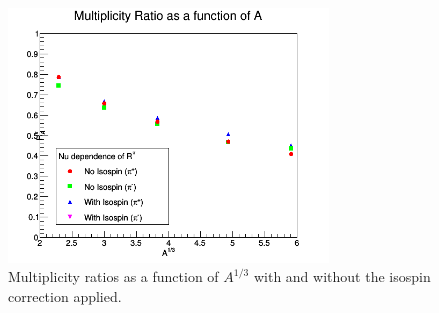\begin{figure}[tbp]
\centering
\includegraphics[width=8.5cm] {new-fig/IsospinCorrection.png}
\caption {Multiplicity ratios as a function of $A^{1/3}$ with and without the isospin correction applied.}
\label{fig:IsoPlot}
\end{figure}



%
%

